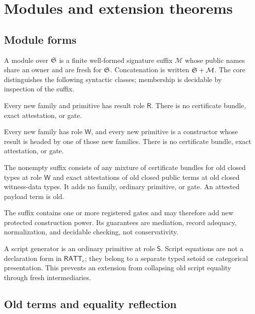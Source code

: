 \documentclass[11pt]{article}
\numberwithin{equation}{section}
\theoremstyle{definition}
\theoremstyle{plain}
\theoremstyle{remark}
\newcommand{\RATT}{\mathsf{RATT}_{\mathrm c}}
\newcommand{\Wit}{\mathsf W}
\newcommand{\Scr}{\mathsf S}
\newcommand{\Ren}{\mathsf R}
\begin{document}
\section{Modules and extension theorems}\label{sec:modules}

\subsection{Module forms}

A module over \({\mathfrak S}\) is a finite well-formed signature suffix
\(\mathcal M\) whose public names share an owner and are fresh for \({\mathfrak S}\).
Concatenation is written \({\mathfrak S}+\mathcal M\).  The core distinguishes the
following syntactic classes; membership is decidable by inspection of the
suffix.

\begin{description}[leftmargin=3.5cm,style=nextline]
\item[Rendering-only]
Every new family and primitive has result role \(\Ren\).  There is no
certificate bundle, exact attestation, or gate.
\item[Fresh-witness-family]
Every new family has role \(\Wit\), and every new primitive is a constructor
whose result is headed by one of those new families.  There is no certificate
bundle, exact attestation, or gate.
\item[Evidence-inhabitant]
The nonempty suffix consists of any mixture of certificate bundles for old
closed types at role \(\Wit\) and exact attestations of old closed public
terms at old closed witness-data types.  It adds no family, ordinary
primitive, or gate.  An attested payload term is old.
\item[Gate module]
The suffix contains one or more registered gates and may therefore add new
protected construction power.  Its guarantees are mediation, record
adequacy, normalization, and decidable checking, not conservativity.
\end{description}

A script generator is an ordinary primitive at role \(\Scr\).  Script
equations are not a declaration form in \(\RATT\); they belong to a separate
typed setoid or categorical presentation.  This prevents an extension from
collapsing old script equality through fresh intermediaries.

\subsection{Old terms and equality reflection}
\end{document}
